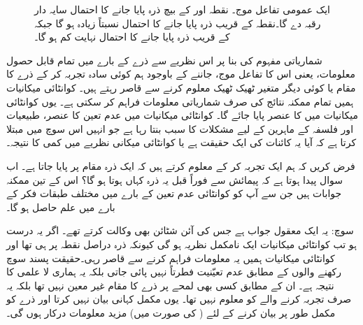 \begin{figure}
\centering
{}
\caption{
ایک عمومی تفاعل موج۔ نقطہ  اور  کے بیچ ذرہ پایا جانے کا احتمال سایہ دار رقبہ دے گا۔نقطہ  کے قریب ذرہ پایا جانے کا احتمال نسبتاً زیادہ ہو گا جبکہ  کے قریب ذرہ پایا جانے کا احتمال نہایت کم ہو گا۔
}
\label{شکل_تفاعل_موج_احتمال_اور_رقبہ}
\end{figure}
شماریاتی مفہوم کی بنا پر اس نظریے سے ذرے کے بارے میں تمام قابل حصول معلومات، یعنی اس کا تفاعل موج، جاننے کے باوجود ہم کوئی سادہ تجربہ کر کے ذرے کا مقام یا کوئی دیگر متغیر ٹھیک ٹھیک معلوم کرنے سے قاصر رہتے ہیں۔ کوانٹائی میکانیات ہمیں تمام ممکنہ نتائج کی صرف شماریاتی معلومات فراہم کر سکتی ہے۔ یوں کوانٹائی میکانیات میں  کا عنصر پایا جائے گا۔ کوانٹائی میکانیات میں عدم تعین کا عنصر، طبیعیات اور فلسفہ کے ماہرین کے لیے مشکلات کا سبب بنتا رہا ہے جو انہیں اس سوچ میں مبتلا کرتا ہے کہ آیا یہ کائنات کی ایک حقیقت ہے یا کوانٹائی میکانی نظریے میں کمی کا نتیجہ۔

 فرض کریں کہ ہم ایک تجربہ کر کے معلوم کرتے ہیں کہ ایک ذرہ مقام  پر پایا جاتا ہے۔ اب سوال پیدا ہوتا ہے کہ پیمائش سے فوراً قبل یہ ذرہ کہاں ہوتا ہو گا؟ اس کے تین ممکنہ جوابات ہیں جن سے آپ کو کوانٹائی عدم تعین کے بارے میں مختلف طبقات فکر کے بارے میں علم حاصل ہو گا۔ 

\quad {}
 سوچ:  یہ ایک معقول جواب ہے جس کی آئن شٹائن بھی وکالت کرتے تھے۔ اگر یہ درست ہو تب کوانٹائی میکانیات ایک نامکمل نظریہ ہو گی کیونکہ ذرہ دراصل نقطہ  پر ہی تھا اور کوانٹائی میکانیات ہمیں یہ معلومات فراہم کرنے سے قاصر رہی۔حقیقت پسند سوچ رکھنے والوں کے مطابق عدم تعیّنیت فطرتاً نہیں پائی جاتی بلکہ یہ ہماری لا علمی کا نتیجہ ہے۔ ان کے مطابق کسی بھی لمحے پر ذرے کا مقام غیر معین نہیں تھا بلکہ یہ صرف تجربہ کرنے والے کو معلوم نہیں تھا۔ یوں  مکمل کہانی بیان نہیں کرتا اور ذرے کو مکمل طور پر بیان کرنے کے لئے ( کی صورت میں) مزید معلومات درکار ہوں گی۔

